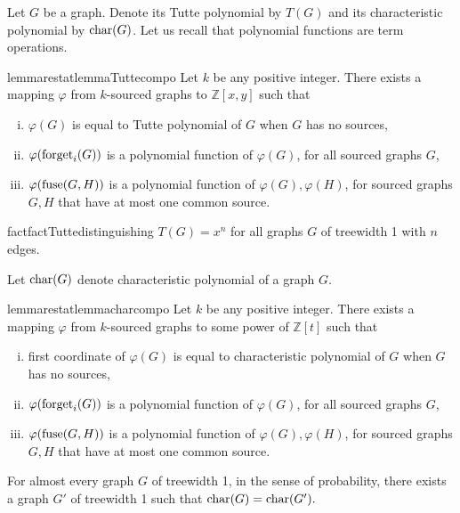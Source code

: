 Let $G$ be a graph. Denote its Tutte polynomial by $T(G)$ and its characteristic polynomial by $\operatorname{char}(G)$. Let us recall that polynomial functions are term operations.
\begin{restatable}{lemmarestat}{lemmaTuttecompo}\label{lem:Tutte-copositional}
	Let $k$ be any positive integer. There exists a mapping $\varphi$ from $k$-sourced graphs to $\mathbb{Z}[x,y]$ such that
	\begin{enumerate}[(i)]
		\item $\varphi(G)$ is equal to Tutte polynomial of $G$ when $G$ has no sources,
		\item $\varphi(\operatorname{forget}_i(G))$ is a polynomial function of $\varphi(G)$, for all sourced graphs $G$,
		\item $\varphi(\operatorname{fuse}(G,H))$ is a polynomial function of $\varphi(G), \varphi(H)$, for sourced graphs $G,H$ that have at most one common source.
	\end{enumerate}
\end{restatable}
\begin{restatable}{fact}{factTuttedistinguishing}\label{fact:Tutte-distinguishing-power}
	$T(G) = x^n$ for all graphs $G$ of treewidth 1 with $n$ edges.
\end{restatable}
Let $\operatorname{char}(G)$ denote characteristic polynomial of a graph $G$.
\begin{restatable}{lemmarestat}{lemmacharcompo}\label{lem:characteristic-compositional}
	Let $k$ be any positive integer. There exists a mapping $\varphi$ from $k$-sourced graphs to some power of $\mathbb{Z}[t]$ such that
	\begin{enumerate}[(i)]
		\item first coordinate of $\varphi(G)$ is equal to characteristic polynomial of $G$ when $G$ has no sources,
		\item $\varphi(\operatorname{forget}_i(G))$ is a polynomial function of $\varphi(G)$, for all sourced graphs $G$,
		\item $\varphi(\operatorname{fuse}(G,H))$ is a polynomial function of $\varphi(G), \varphi(H)$, for sourced graphs $G,H$ that have at most one common source.
	\end{enumerate}
\end{restatable}
\begin{fact}\label{fact:characteristic-distinguishing-power}\cite{schwenkCospectral73}
	For almost every graph $G$ of treewidth 1, in the sense of probability, there exists a graph $G'$ of treewidth 1 such that
	$
		\operatorname{char}(G) = \operatorname{char}(G').
	$
\end{fact}

